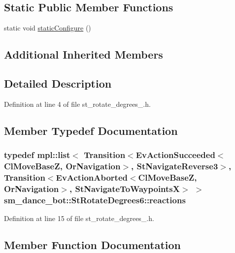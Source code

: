\subsection*{Static Public Member Functions}
\begin{DoxyCompactItemize}
\item 
static void \hyperlink{structsm__dance__bot_1_1StRotateDegrees6_a5f6ee6518c741f6ecbb4e18957b63893}{static\+Configure} ()
\end{DoxyCompactItemize}
\subsection*{Additional Inherited Members}


\subsection{Detailed Description}


Definition at line 4 of file st\+\_\+rotate\+\_\+degrees\+\_.\+h.



\subsection{Member Typedef Documentation}
\subsubsection[{\texorpdfstring{reactions}{reactions}}]{\setlength{\rightskip}{0pt plus 5cm}typedef mpl\+::list$<$ Transition$<$Ev\+Action\+Succeeded$<${\bf Cl\+Move\+BaseZ}, {\bf Or\+Navigation}$>$, {\bf St\+Navigate\+Reverse3}$>$, Transition$<$Ev\+Action\+Aborted$<${\bf Cl\+Move\+BaseZ}, {\bf Or\+Navigation}$>$, {\bf St\+Navigate\+To\+WaypointsX}$>$ $>$ {\bf sm\+\_\+dance\+\_\+bot\+::\+St\+Rotate\+Degrees6\+::reactions}}\hypertarget{structsm__dance__bot_1_1StRotateDegrees6_a6f12012f35d4f854115f900ea511d75d}{}\label{structsm__dance__bot_1_1StRotateDegrees6_a6f12012f35d4f854115f900ea511d75d}


Definition at line 15 of file st\+\_\+rotate\+\_\+degrees\+\_.\+h.



\subsection{Member Function Documentation}
